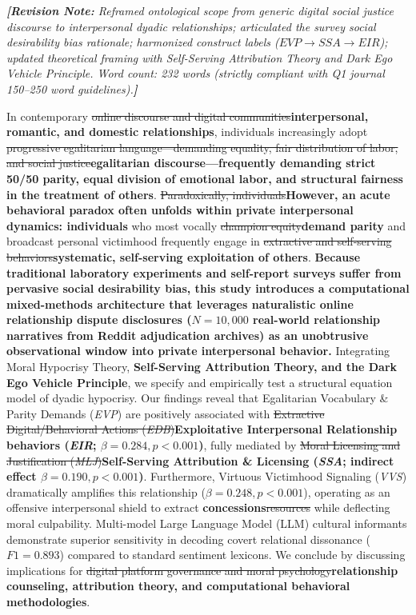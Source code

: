 \documentclass[11pt,a4paper]{article}
\newcommand{\textadded}[1]{{\color{blue!80!black}\textbf{#1}}}
\newcommand{\textdeleted}[1]{{\color{red!70!black}\sout{#1}}}
\newcommand{\textnote}[1]{\noindent\textit{\textcolor{teal!80!black}{\textbf{[Revision Note:} #1\textbf{]}}}\\[0.5ex]}
\begin{document}
\textnote{Reframed ontological scope from generic digital social justice discourse to interpersonal dyadic relationships; articulated the survey social desirability bias rationale; harmonized construct labels ($EVP \rightarrow SSA \rightarrow EIR$); updated theoretical framing with Self-Serving Attribution Theory and Dark Ego Vehicle Principle. Word count: 232 words (strictly compliant with Q1 journal 150--250 word guidelines).}

\begin{tcolorbox}[colback=gray!5!white,colframe=gray!50!black,title=\textbf{Abstract (Tracked Changes Redline View)}]
\noindent In contemporary \textdeleted{online discourse and digital communities}\textadded{interpersonal, romantic, and domestic relationships}, individuals increasingly adopt \textdeleted{progressive egalitarian language---demanding equality, fair distribution of labor, and social justice}\textadded{egalitarian discourse---frequently demanding strict 50/50 parity, equal division of emotional labor, and structural fairness in the treatment of others}. \textdeleted{Paradoxically, individuals}\textadded{However, an acute behavioral paradox often unfolds within private interpersonal dynamics: individuals} who most vocally \textdeleted{champion equity}\textadded{demand parity} and broadcast personal victimhood frequently engage in \textdeleted{extractive and self-serving behaviors}\textadded{systematic, self-serving exploitation of others}. \textadded{Because traditional laboratory experiments and self-report surveys suffer from pervasive social desirability bias, this study introduces a computational mixed-methods architecture that leverages naturalistic online relationship dispute disclosures ($N = 10,000$ real-world relationship narratives from Reddit adjudication archives) as an unobtrusive observational window into private interpersonal behavior.} Integrating Moral Hypocrisy Theory, \textadded{Self-Serving Attribution Theory, and the Dark Ego Vehicle Principle}, we specify and empirically test a structural equation model of dyadic hypocrisy. Our findings reveal that Egalitarian Vocabulary \& Parity Demands (\textit{EVP}) are positively associated with \textdeleted{Extractive Digital/Behavioral Actions (\textit{EDB})}\textadded{Exploitative Interpersonal Relationship behaviors (\textit{EIR}; $\beta = 0.284, p < 0.001$)}, fully mediated by \textdeleted{Moral Licensing and Justification (\textit{MLJ})}\textadded{Self-Serving Attribution \& Licensing (\textit{SSA}; indirect effect $\beta = 0.190, p < 0.001$)}. Furthermore, Virtuous Victimhood Signaling (\textit{VVS}) dramatically amplifies this relationship ($\beta = 0.248, p < 0.001$), operating as an offensive interpersonal shield to extract \textadded{concessions}\textdeleted{resources} while deflecting moral culpability. Multi-model Large Language Model (LLM) cultural informants demonstrate superior sensitivity in decoding covert relational dissonance ($F1 = 0.893$) compared to standard sentiment lexicons. We conclude by discussing implications for \textdeleted{digital platform governance and moral psychology}\textadded{relationship counseling, attribution theory, and computational behavioral methodologies}.
\end{tcolorbox}
\end{document}
